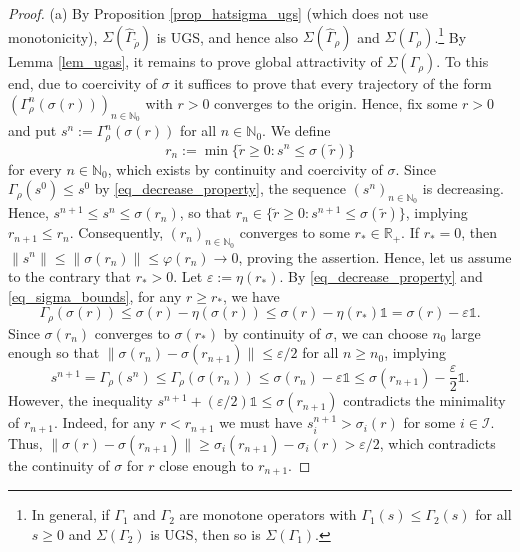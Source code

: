 \documentclass[10pt, oneside, a4paper]{article}
\newcommand{\N}{\mathbb{N}}
\newcommand{\R}{\mathbb{R}}
\newcommand{\ep}{\varepsilon}
\newcommand{\unit}{\mathds{1}}
\newcommand{\IC}{\mathcal{I}}
\begin{document}
\begin{proof}
(a) By Proposition \ref{prop_hatsigma_ugs} (which does not use monotonicity), $\Sigma(\hat{\Gamma}_{\tilde{\rho}})$ is UGS, and hence also $\Sigma(\hat{\Gamma}_{\rho})$ and $\Sigma(\Gamma_{\rho})$.\footnote{In general, if $\Gamma_1$ and $\Gamma_2$ are monotone operators with $\Gamma_1(s) \leq \Gamma_2(s)$ for all $s \geq 0$ and $\Sigma(\Gamma_2)$ is UGS, then so is $\Sigma(\Gamma_1)$.} By Lemma \ref{lem_ugas}, it remains to prove global attractivity of $\Sigma(\Gamma_{\rho})$. To this end, due to coercivity of $\sigma$ it suffices to prove that every trajectory of the form $(\Gamma_{\rho}^n(\sigma(r)))_{n \in \N_0}$ with $r > 0$ converges to the origin. Hence, fix some $r > 0$ and put $s^n := \Gamma_{\rho}^n(\sigma(r))$ for all $n \in \N_0$. We define%
\begin{equation*}
  r_n := \min\{ \tilde{r} \geq 0 : s^n \leq \sigma(\tilde{r}) \}%
\end{equation*}
for every $n \in \N_0$, which exists by continuity and coercivity of $\sigma$. Since $\Gamma_{\rho}(s^0) \leq s^0$ by \eqref{eq_decrease_property}, the sequence $(s^n)_{n\in\N_0}$ is decreasing. Hence, $s^{n+1} \leq s^n \leq \sigma(r_n)$, so that $r_n \in \{\tilde{r} \geq 0 : s^{n+1} \leq \sigma(\tilde{r}) \}$, implying $r_{n+1} \leq r_n$. Consequently, $(r_n)_{n\in\N_0}$ converges to some $r_* \in \R_+$. If $r_* = 0$, then $\|s^n\| \leq \|\sigma(r_n)\| \leq \varphi(r_n) \rightarrow 0$, proving the assertion. Hence, let us assume to the contrary that $r_* > 0$. Let $\ep := \eta(r_*)$. By \eqref{eq_decrease_property} and \eqref{eq_sigma_bounds}, for any $r \geq r_*$, we have%
\begin{equation*}
  \Gamma_{\rho}(\sigma(r)) \leq \sigma(r) - \eta(\sigma(r)) \leq \sigma(r) - \eta(r_*)\unit = \sigma(r) - \ep\unit.%
\end{equation*}
Since $\sigma(r_n)$ converges to $\sigma(r_*)$ by continuity of $\sigma$, we can choose $n_0$ large enough so that $\|\sigma(r_n) - \sigma(r_{n+1})\| \leq \ep/2$ for all $n \geq n_0$, implying%
\begin{equation*}
  s^{n+1} = \Gamma_{\rho}(s^n) \leq \Gamma_{\rho}(\sigma(r_n)) \leq \sigma(r_n) - \ep\unit \leq \sigma(r_{n+1}) - \frac{\ep}{2}\unit.%
\end{equation*}
However, the inequality $s^{n+1} + (\ep/2)\unit \leq \sigma(r_{n+1})$ contradicts the minimality of $r_{n+1}$. Indeed, for any $r < r_{n+1}$ we must have $s^{n+1}_i > \sigma_i(r)$ for some $i \in \IC$. Thus, $\|\sigma(r) - \sigma(r_{n+1})\| \geq \sigma_i(r_{n+1}) - \sigma_i(r) > \ep/2$, which contradicts the continuity of $\sigma$ for $r$ close enough to $r_{n+1}$.%


\end{proof}
\end{document}
